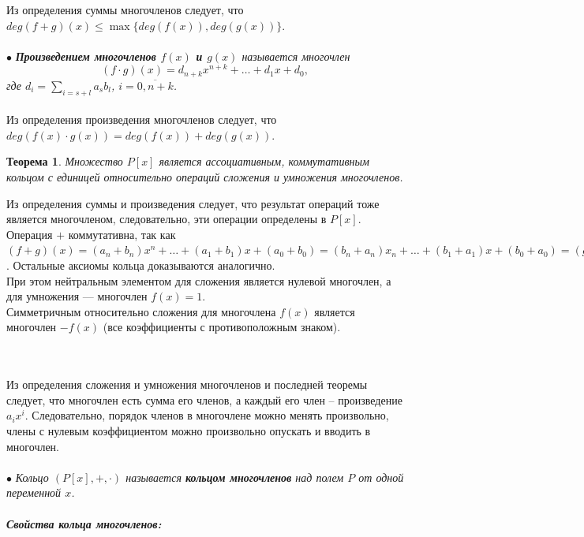 Из определения суммы многочленов следует, что $deg(f+g)(x) \leqslant \max\{ deg(f(x)), deg(g(x))\}$.\\\\
$\bullet$ \textit{\textbf{Произведением многочленов $f(x)$ и $g(x)$} называется многочлен $$(f\cdot g)(x) = d_{n+k}x^{n+k} + \ldots + d_1x + d_0,$$ где $d_i = \sum_{i=s+l}a_sb_l$, $i = \overline{0, n+k}$.}\\\\
Из определения произведения многочленов следует, что $deg(f(x)\cdot g(x)) = deg(f(x))+deg(g(x))$.
\newtheorem*{t8_3_1}{Теорема}\begin{t8_3_1}
	Множество $P[x]$ является ассоциативным, коммутативным кольцом с единицей 
	относительно операций сложения и умножения многочленов. 
\end{t8_3_1}
\begin{Proof}
	Из определения суммы и произведения следует, что результат операций тоже является многочленом, следовательно, эти операции определены в $P[x]$.\\
	Операция $+$ коммутативна, так как $(f + g)(x) = (a_n + b_n)x^n + … + (a_1 + b_1)x + (a_0 + b_0) = (b_n + a_n)x_n + … + (b_1
	+ a_1)x + (b_0 + a_0) = (g + f)(x)$. Остальные аксиомы кольца доказываются аналогично.\\
	При этом нейтральным элементом для сложения является нулевой многочлен, а для умножения --- многочлен $f(x) = 1$.\\
	Симметричным относительно сложения для многочлена $f(x)$ является многочлен $-f(x)$ (все коэффициенты с противоположным
	знаком).
\end{Proof}\\\\
Из определения сложения и умножения многочленов и последней теоремы следует, что многочлен 
есть сумма его членов, а каждый его член – произведение $a_ix^i$. Следовательно, порядок членов в многочлене 
можно менять произвольно, члены с нулевым коэффициентом можно произвольно опускать и 
вводить в многочлен.\\\\
$\bullet$ \textit{Кольцо $(P[x], +, \cdot)$ называется \textbf{кольцом многочленов} над полем $P$ от одной переменной $x$.}\\\\
\textit{\textbf{Свойства кольца многочленов:}}
